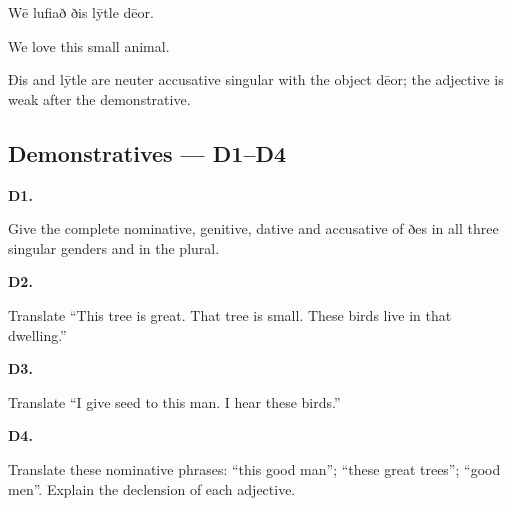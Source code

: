Wē lufiað ðis lȳtle dēor.

We love this small animal.

Ðis and lȳtle are neuter accusative singular with the object dēor; the adjective is weak after the demonstrative.

\subsection*{Demonstratives — D1–D4}

\par\begin{minipage}{\linewidth}\raggedright
\textbf{D1.}

Give the complete nominative, genitive, dative and accusative of ðes in all three singular genders and in the plural.

\end{minipage}\par\addvspace{4pt}

\par\begin{minipage}{\linewidth}\raggedright
\textbf{D2.}

Translate “This tree is great. That tree is small. These birds live in that dwelling.”

\end{minipage}\par\addvspace{4pt}

\par\begin{minipage}{\linewidth}\raggedright
\textbf{D3.}

Translate “I give seed to this man. I hear these birds.”

\end{minipage}\par\addvspace{4pt}

\par\begin{minipage}{\linewidth}\raggedright
\textbf{D4.}

Translate these nominative phrases: “this good man”; “these great trees”; “good men”. Explain the declension of each adjective.

\end{minipage}\par\addvspace{4pt}

